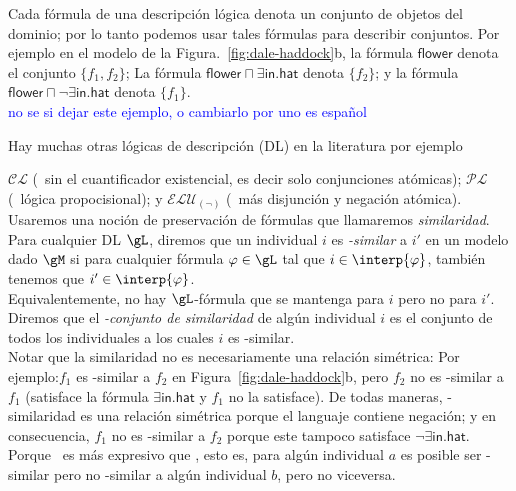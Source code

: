 Cada f\'ormula de una descripci\'on l\'ogica denota un conjunto de objetos del dominio; por lo tanto podemos usar tales f\'ormulas para describir conjuntos. Por ejemplo en el modelo de la Figura.~\ref{fig:dale-haddock}b, la f\'ormula
$\mathsf{flower}$ denota el conjunto $\{f_1,f_2\}$; La f\'ormula
$\mathsf{flower} \sqcap \exists \mathsf{in}.\mathsf{hat}$ denota
$\{f_2\}$; y la f\'ormula $\mathsf{flower} \sqcap \neg
\exists \mathsf{in}.\mathsf{hat}$ denota $\{f_1\}$.\\

\textcolor{blue}{no se si dejar este ejemplo, o cambiarlo por uno es espa\~nol}

Hay muchas otras l\'ogicas de descripci\'on (DL) en la literatura por ejemplo 

$\mathcal{CL}$ (\el\ sin el cuantificador existencial, es decir solo conjunciones at\'omicas); $\mathcal{PL}$ (\alc\ l\'ogica propocisional); y
$\mathcal{ELU}_{(\neg)}$ (\el\ m\'as disjunci\'on y negaci\'on at\'omica).\\

Usaremos una noci\'on de preservaci\'on de f\'ormulas que llamaremos
\emph{similaridad}. Para cualquier DL $\gL$, diremos que un individual $i$ es \emph{\gL-similar} a $i'$ en un modelo dado $\gM$
si para cualquier f\'ormula $\varphi \in \gL$ tal que $i \in
\interp{\varphi}$, tambi\'en tenemos que $i' \in \interp{\varphi}$.\\
Equivalentemente, no hay $\gL$-f\'ormula que se mantenga para $i$ pero no para
$i'$.  Diremos que el \emph{\gL-conjunto de similaridad} de alg\'un individual
$i$ es el conjunto de todos los individuales a los cuales $i$ es \gL-similar.\\

Notar que la similaridad no es necesariamente una relaci\'on sim\'etrica: Por ejemplo:$f_1$ es \el-similar a $f_2$ en
Figura~\ref{fig:dale-haddock}b, pero $f_2$ no es \el-similar a $f_1$
(satisface la f\'ormula $\exists \mathsf{in}.\mathsf{hat}$ y $f_1$
no la satisface).  De todas maneras, \alc-similaridad es una relaci\'on sim\'etrica porque
el languaje contiene negaci\'on; y en consecuencia, $f_1$ no es \alc-similar
a $f_2$ porque este tampoco satisface $\neg \exists
\mathsf{in}.\mathsf{hat}$.  Porque \alc\ es m\'as expresivo que \el,
esto es, para alg\'un individual $a$ es posible ser \el-similar pero
no \alc-similar a alg\'un individual $b$, pero no viceversa.\\




